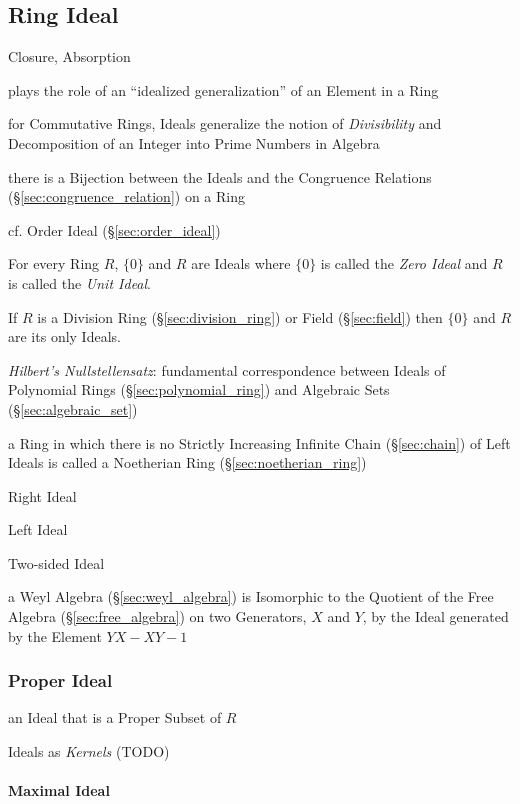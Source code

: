 \subsection{Ring Ideal}\label{sec:ring_ideal}

Closure, Absorption

plays the role of an ``idealized generalization'' of an Element in a Ring

for Commutative Rings, Ideals generalize the notion of \emph{Divisibility} and
Decomposition of an Integer into Prime Numbers in Algebra

there is a Bijection between the Ideals and the Congruence Relations
(\S\ref{sec:congruence_relation}) on a Ring

\fist cf. Order Ideal (\S\ref{sec:order_ideal})

For every Ring $R$, $\{0\}$ and $R$ are Ideals where $\{0\}$ is called
the \emph{Zero Ideal} and $R$ is called the \emph{Unit Ideal}.

If $R$ is a Division Ring (\S\ref{sec:division_ring}) or Field
(\S\ref{sec:field}) then $\{0\}$ and $R$ are its only Ideals.

\emph{Hilbert's Nullstellensatz}: fundamental correspondence between Ideals of
Polynomial Rings (\S\ref{sec:polynomial_ring}) and Algebraic Sets
(\S\ref{sec:algebraic_set})

a Ring in which there is no Strictly Increasing Infinite Chain
(\S\ref{sec:chain}) of Left Ideals is called a Noetherian Ring
(\S\ref{sec:noetherian_ring})

Right Ideal

Left Ideal

Two-sided Ideal

\fist a Weyl Algebra (\S\ref{sec:weyl_algebra}) is Isomorphic to the Quotient
of the Free Algebra (\S\ref{sec:free_algebra}) on two Generators, $X$ and $Y$,
by the Ideal generated by the Element $YX - XY - 1$



\subsubsection{Proper Ideal}\label{sec:proper_ideal}

an Ideal that is a Proper Subset of $R$

Ideals as \emph{Kernels} (TODO)



\paragraph{Maximal Ideal}\label{sec:maximal_ring_ideal}\hfill

